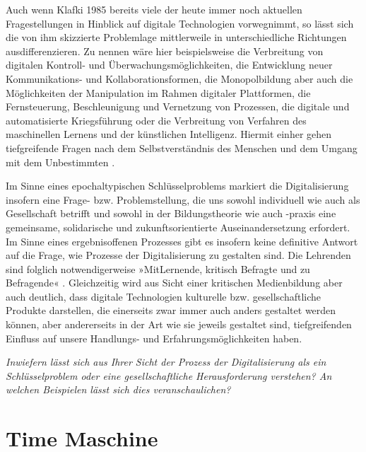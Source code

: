 \documentclass[
  a4paper,
]{book}
\begin{document}
Auch wenn Klafki 1985 bereits viele der heute immer noch aktuellen Fragestellungen in Hinblick auf digitale Technologien vorwegnimmt, so lässt sich die von ihm skizzierte Problemlage mittlerweile in unterschiedliche Richtungen ausdifferenzieren. Zu nennen wäre hier beispielsweise die Verbreitung von digitalen Kontroll- und Überwachungsmöglichkeiten, die Entwicklung neuer Kommunikations- und Kollaborationsformen, die Monopolbildung aber auch die Möglichkeiten der Manipulation im Rahmen digitaler Plattformen, die Fernsteuerung, Beschleunigung und Vernetzung von Prozessen, die digitale und automatisierte Kriegsführung oder die Verbreitung von Verfahren des maschinellen Lernens und der künstlichen Intelligenz. Hiermit einher gehen tiefgreifende Fragen nach dem Selbstverständnis des Menschen \citep[z. B.][]{heintzHerrschaftRegelZur1993} und dem Umgang mit dem Unbestimmten \citep[z. B.][]{allertBildungAlsProduktive2017}.

Im Sinne eines epochaltypischen Schlüsselproblems markiert die Digitalisierung insofern eine Frage- bzw. Problemstellung, die uns sowohl individuell wie auch als Gesellschaft betrifft und sowohl in der Bildungstheorie wie auch -praxis eine gemeinsame, solidarische und zukunftsorientierte Auseinandersetzung erfordert. Im Sinne eines ergebnisoffenen Prozesses gibt es insofern keine definitive Antwort auf die Frage, wie Prozesse der Digitalisierung zu gestalten sind. Die Lehrenden sind folglich notwendigerweise »MitLernende, kritisch Befragte und zu Befragende« \citep[S. 49]{klafkiNeueStudienZur2007}. Gleichzeitig wird aus Sicht einer kritischen Medienbildung aber auch deutlich, dass digitale Technologien kulturelle bzw. gesellschaftliche Produkte darstellen, die einerseits zwar immer auch anders gestaltet werden können, aber andererseits in der Art wie sie jeweils gestaltet sind, tiefgreifenden Einfluss auf unsere Handlungs- und Erfahrungsmöglichkeiten haben.

\begin{blackbox}
\emph{Inwiefern lässt sich aus Ihrer Sicht der Prozess der Digitalisierung als ein Schlüsselproblem oder eine gesellschaftliche Herausforderung verstehen? An welchen Beispielen lässt sich dies veranschaulichen?}

\end{blackbox}

\section{Time Maschine}\label{time-maschine}
\end{document}
